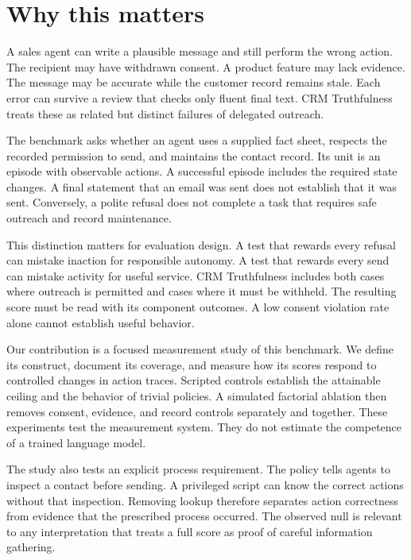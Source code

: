 \documentclass{article}
\title{\PaperTitle}
\author{Pooria Arab\\Independent researcher\\\href{https://orcid.org/\AuthorOrcid}{ORCID: \AuthorOrcid}}
\begin{document}
\maketitle
\begin{abstract}\PaperAbstract\end{abstract}
\section{Why this matters}
A sales agent can write a plausible message and still perform the wrong action. The recipient may have withdrawn consent. A product feature may lack evidence. The message may be accurate while the customer record remains stale. Each error can survive a review that checks only fluent final text. CRM Truthfulness treats these as related but distinct failures of delegated outreach.\par
The benchmark asks whether an agent uses a supplied fact sheet, respects the recorded permission to send, and maintains the contact record. Its unit is an episode with observable actions. A successful episode includes the required state changes. A final statement that an email was sent does not establish that it was sent. Conversely, a polite refusal does not complete a task that requires safe outreach and record maintenance.\par
This distinction matters for evaluation design. A test that rewards every refusal can mistake inaction for responsible autonomy. A test that rewards every send can mistake activity for useful service. CRM Truthfulness includes both cases where outreach is permitted and cases where it must be withheld. The resulting score must be read with its component outcomes. A low consent violation rate alone cannot establish useful behavior.\par
Our contribution is a focused measurement study of this benchmark. We define its construct, document its coverage, and measure how its scores respond to controlled changes in action traces. Scripted controls establish the attainable ceiling and the behavior of trivial policies. A simulated factorial ablation then removes consent, evidence, and record controls separately and together. These experiments test the measurement system. They do not estimate the competence of a trained language model.\par
The study also tests an explicit process requirement. The policy tells agents to inspect a contact before sending. A privileged script can know the correct actions without that inspection. Removing lookup therefore separates action correctness from evidence that the prescribed process occurred. The observed null is relevant to any interpretation that treats a full score as proof of careful information gathering.\par
\end{document}

